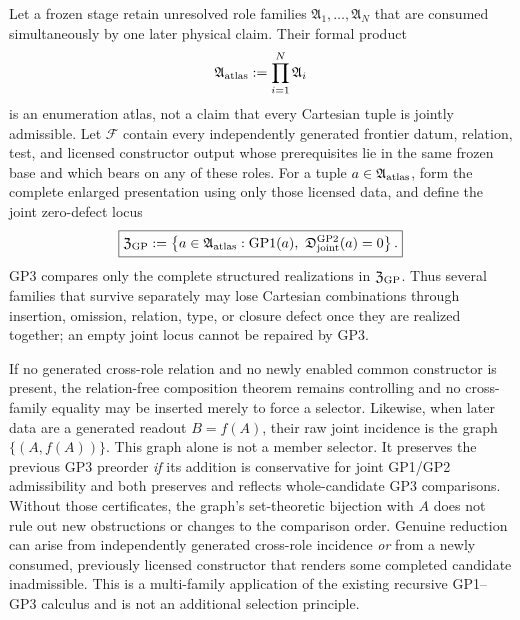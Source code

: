 \documentclass[12pt,a4paper]{article}
\begin{document}
\begin{corollary}
\label{p2:cor:joint-unresolved-family-exhaustion}
Let a frozen stage retain unresolved role families
\(
 \mathfrak A_1,\ldots,\mathfrak A_N
\)
that are consumed simultaneously by one later physical claim.  Their formal
product
\[
 \mathfrak A_{\rm atlas}:=\prod_{i=1}^{N}\mathfrak A_i
\]
is an enumeration atlas, not a claim that every Cartesian tuple is jointly
admissible.  Let \(\mathcal F\) contain every independently generated frontier
datum, relation, test, and licensed constructor output whose prerequisites lie
in the same frozen base and which bears on any of these roles.  For a tuple
\(a\in\mathfrak A_{\rm atlas}\), form the complete enlarged presentation using
only those licensed data, and define the joint zero-defect locus
\[
 \boxed{
 \mathfrak Z_{\rm GP}
 :=\left\{a\in\mathfrak A_{\rm atlas}:
      {\rm GP1}(a),\ 
      \mathfrak D_{\rm joint}^{\rm GP2}(a)=0
   \right\}.}
\]
GP3 compares only the complete structured realizations in
\(\mathfrak Z_{\rm GP}\).  Thus several families that survive separately may
lose Cartesian combinations through insertion, omission, relation, type, or
closure defect once they are realized together; an empty joint locus cannot be
repaired by GP3.

If no generated cross-role relation and no newly enabled common constructor is
present, the relation-free composition theorem remains controlling and no
cross-family equality may be inserted merely to force a selector.  Likewise, when later data are a generated readout \(B=f(A)\), their raw
joint incidence is the graph \(\{(A,f(A))\}\).  This graph alone is not a
member selector.  It preserves the previous GP3 preorder \emph{if} its
addition is conservative for joint GP1/GP2 admissibility and both preserves
and reflects whole-candidate GP3 comparisons.  Without those certificates,
the graph's set-theoretic bijection with \(A\) does not rule out new
obstructions or changes to the comparison order.  Genuine reduction can
arise from independently generated cross-role incidence \emph{or} from a
newly consumed, previously licensed constructor that renders some completed
candidate inadmissible.  This is a
multi-family application of the existing recursive GP1--GP3 calculus and is
not an additional selection principle.
\end{corollary}
\end{document}
